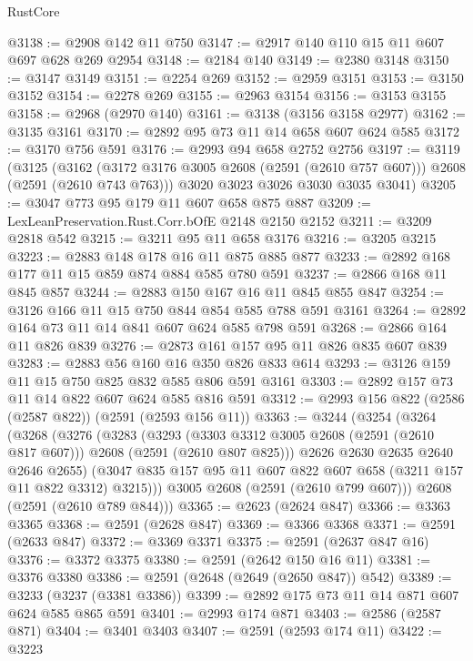 \begin{lexlean}{RustCore}
\begin{coremodule}
@3138 := @2908 @142 @11 @750
@3147 := @2917 @140 @110 @15 @11 @607 @697 @628 @269 @2954
@3148 := @2184 @140
@3149 := @2380 @3148
@3150 := @3147 @3149
@3151 := @2254 @269
@3152 := @2959 @3151
@3153 := @3150 @3152
@3154 := @2278 @269
@3155 := @2963 @3154
@3156 := @3153 @3155
@3158 := @2968 (@2970 @140)
@3161 := @3138 (@3156 @3158 @2977)
@3162 := @3135 @3161
@3170 := @2892 @95 @73 @11 @14 @658 @607 @624 @585
@3172 := @3170 @756 @591
@3176 := @2993 @94 @658 @2752 @2756
@3197 := @3119
    (@3125
      (@3162 (@3172 @3176 @3005 @2608 (@2591 (@2610 @757 @607))) @2608 (@2591 (@2610 @743 @763)))
      @3020
      @3023
      @3026
      @3030
      @3035
      @3041)
@3205 := @3047 @773 @95 @179 @11 @607 @658 @875 @887
@3209 := LexLeanPreservation.Rust.Corr.bOfE @2148 @2150 @2152
@3211 := @3209 @2818 @542
@3215 := @3211 @95 @11 @658 @3176
@3216 := @3205 @3215
@3223 := @2883 @148 @178 @16 @11 @875 @885 @877
@3233 := @2892 @168 @177 @11 @15 @859 @874 @884 @585 @780 @591
@3237 := @2866 @168 @11 @845 @857
@3244 := @2883 @150 @167 @16 @11 @845 @855 @847
@3254 := @3126 @166 @11 @15 @750 @844 @854 @585 @788 @591 @3161
@3264 := @2892 @164 @73 @11 @14 @841 @607 @624 @585 @798 @591
@3268 := @2866 @164 @11 @826 @839
@3276 := @2873 @161 @157 @95 @11 @826 @835 @607 @839
@3283 := @2883 @56 @160 @16 @350 @826 @833 @614
@3293 := @3126 @159 @11 @15 @750 @825 @832 @585 @806 @591 @3161
@3303 := @2892 @157 @73 @11 @14 @822 @607 @624 @585 @816 @591
@3312 := @2993 @156 @822 (@2586 (@2587 @822)) (@2591 (@2593 @156 @11))
@3363 := @3244
    (@3254
      (@3264
        (@3268
          (@3276
            (@3283
              (@3293
                (@3303 @3312 @3005 @2608 (@2591 (@2610 @817 @607)))
                @2608
                (@2591 (@2610 @807 @825)))
              @2626
              @2630
              @2635
              @2640
              @2646
              @2655)
            (@3047 @835 @157 @95 @11 @607 @822 @607 @658 (@3211 @157 @11 @822 @3312) @3215)))
        @3005
        @2608
        (@2591 (@2610 @799 @607)))
      @2608
      (@2591 (@2610 @789 @844)))
@3365 := @2623 (@2624 @847)
@3366 := @3363 @3365
@3368 := @2591 (@2628 @847)
@3369 := @3366 @3368
@3371 := @2591 (@2633 @847)
@3372 := @3369 @3371
@3375 := @2591 (@2637 @847 @16)
@3376 := @3372 @3375
@3380 := @2591 (@2642 @150 @16 @11)
@3381 := @3376 @3380
@3386 := @2591 (@2648 (@2649 (@2650 @847)) @542)
@3389 := @3233 (@3237 (@3381 @3386))
@3399 := @2892 @175 @73 @11 @14 @871 @607 @624 @585 @865 @591
@3401 := @2993 @174 @871
@3403 := @2586 (@2587 @871)
@3404 := @3401 @3403
@3407 := @2591 (@2593 @174 @11)
@3422 := @3223

\end{coremodule}
\end{lexlean}
